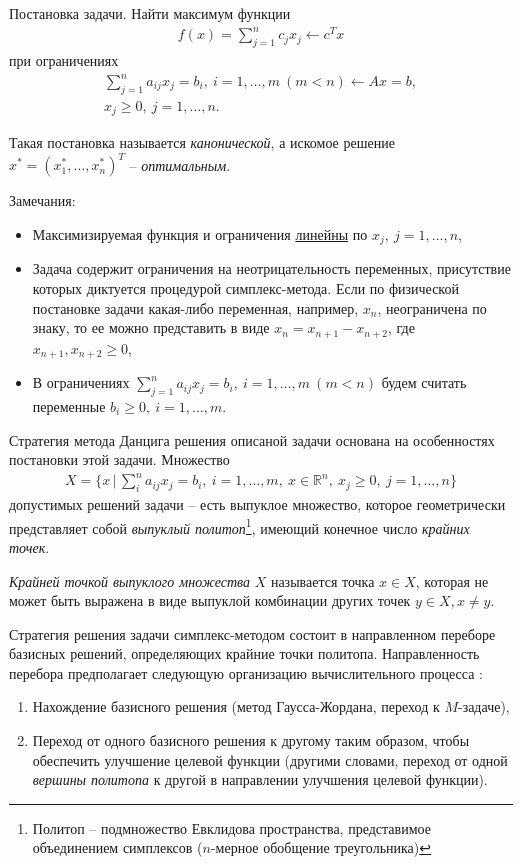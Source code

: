 \documentclass[%
	11pt,
	a4paper,
	utf8,
		]{article}
\begin{document}
Постановка задачи. Найти максимум функции
\begin{align*}
f(x) = \sum_{j=1}^{n} c_j x_j \leftarrow c^T x
\end{align*}
при ограничениях
\begin{align*}
	\sum_{j=1}^{n} a_{ij} x_j = b_i, \ i = 1, \ldots, m\  (m < n) \leftarrow Ax = b,\\
	x_j \geqslant 0, \ j = 1, \ldots, n.
\end{align*}

Такая постановка называется \emph{канонической}, а искомое решение $ x^{*} = (x_1^{*}, \ldots, x_n^{*})^T $ -- \emph{оптимальным}.

Замечания:
\begin{itemize}
	\item Максимизируемая функция и ограничения \underline{линейны} по $ x_j, \ j = 1, \ldots, n $,
	
	\item Задача содержит ограничения на неотрицательность переменных, присутствие которых диктуется процедурой симплекс-метода. Если по физической постановке задачи какая-либо переменная, например, $ x_n $, неограничена по знаку, то ее можно представить в виде $ x_n = x_{n+1} - x_{n+2} $, где $ x_{n+1}, x_{n+2} \geqslant 0 $,
	
	\item В ограничениях $ \sum\limits_{j=1}^{n} a_{ij} x_j = b_i, \ i = 1, \ldots, m\  (m < n) $ будем считать переменные $ b_i \geqslant 0, \ i = 1, \ldots, m $.
\end{itemize}

Стратегия метода Данцига решения описаной задачи основана на особенностях постановки этой задачи. Множество
\begin{align*}
	X = \{ x \, | \, \sum_{i}^{n} a_{ij} x_j = b_i, \ i = 1, \ldots, m, \ x \in \mathbb{R}^n, \ x_j \geqslant 0, \ j = 1, \ldots, n \}
\end{align*}
допустимых решений задачи -- есть выпуклое множество, которое геометрически представляет собой \emph{выпуклый политоп}\footnote{Политоп -- подмножество Евклидова пространства, представимое объединением симплексов ($ n $-мерное обобщение треугольника)}, имеющий конечное число \emph{крайних точек}.

\emph{Крайней точкой выпуклого множества} $ X $ называется точка $ x \in X $, которая не может быть выражена в виде выпуклой комбинации других точек $ y \in X, x \neq y $.

Стратегия решения задачи симплекс-методом состоит в направленном переборе базисных решений, определяющих крайние точки политопа. Направленность перебора предполагает следующую организацию вычислительного процесса \cite{panteleev}:
\begin{enumerate}
	\item Нахождение базисного решения (метод Гаусса-Жордана, переход к $ M $-задаче),
	
	\item Переход от одного базисного решения к другому таким образом, чтобы обеспечить улучшение целевой функции (другими словами, переход от одной \emph{вершины политопа} к другой в направлении улучшения целевой функции).
\end{enumerate}
\end{document}
